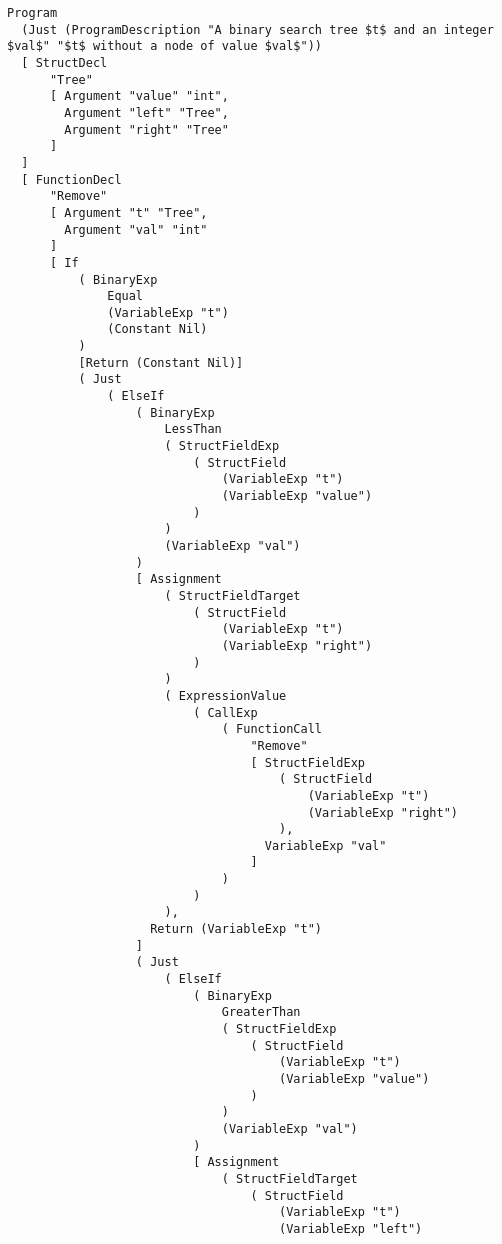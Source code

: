 \begin{lstlisting}
Program
  (Just (ProgramDescription "A binary search tree $t$ and an integer $val$" "$t$ without a node of value $val$"))
  [ StructDecl
      "Tree"
      [ Argument "value" "int",
        Argument "left" "Tree",
        Argument "right" "Tree"
      ]
  ]
  [ FunctionDecl
      "Remove"
      [ Argument "t" "Tree",
        Argument "val" "int"
      ]
      [ If
          ( BinaryExp
              Equal
              (VariableExp "t")
              (Constant Nil)
          )
          [Return (Constant Nil)]
          ( Just
              ( ElseIf
                  ( BinaryExp
                      LessThan
                      ( StructFieldExp
                          ( StructField
                              (VariableExp "t")
                              (VariableExp "value")
                          )
                      )
                      (VariableExp "val")
                  )
                  [ Assignment
                      ( StructFieldTarget
                          ( StructField
                              (VariableExp "t")
                              (VariableExp "right")
                          )
                      )
                      ( ExpressionValue
                          ( CallExp
                              ( FunctionCall
                                  "Remove"
                                  [ StructFieldExp
                                      ( StructField
                                          (VariableExp "t")
                                          (VariableExp "right")
                                      ),
                                    VariableExp "val"
                                  ]
                              )
                          )
                      ),
                    Return (VariableExp "t")
                  ]
                  ( Just
                      ( ElseIf
                          ( BinaryExp
                              GreaterThan
                              ( StructFieldExp
                                  ( StructField
                                      (VariableExp "t")
                                      (VariableExp "value")
                                  )
                              )
                              (VariableExp "val")
                          )
                          [ Assignment
                              ( StructFieldTarget
                                  ( StructField
                                      (VariableExp "t")
                                      (VariableExp "left")

\end{lstlisting}

